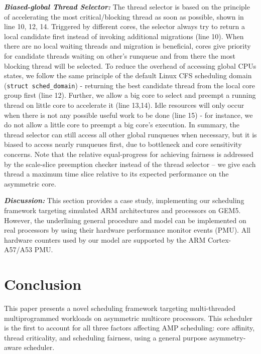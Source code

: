 \documentclass[10pt,conference]{IEEEtran}
\begin{document}
\textbf{\textit{Biased-global Thread Selector:}}
The thread selector is based on the principle of accelerating the most critical/blocking thread as soon as possible, shown in line 10, 12, 14. Triggered by different cores, the selector always try to return  a local candidate first instead of invoking additional migrations (line 10). When there are no local waiting threads and migration is beneficial, cores give priority for candidate threads waiting on other's runqueue and from there the most blocking thread will be selected.
To reduce the overhead of accessing global CPUs states, we follow the same principle of the default Linux CFS scheduling domain (\texttt{struct sched\_domain}) - returning the best candidate thread from the local core group first (line 12).
Further, we allow a big core to select and preempt a running thread on little core to accelerate it (line 13,14). Idle resources will only occur when there is not any possible useful work to be done (line 15) - for instance, we do not allow a little core to preempt a big core's execution. 
In summary, the thread selector can still access all other global runqueues when necessary, but it is biased to access nearly runqueues first, due to bottleneck and core sensitivity concerns. 
Note that the relative equal-progress for achieving fairness is addressed by the scale-slice preemption checker instead of the thread selector -- we give each thread a maximum time slice relative to its expected performance on the asymmetric core.

\textbf{\textit{Discussion:}}
This section provides a case study, implementing our scheduling framework targeting simulated ARM architectures and processors on GEM5.  However, the underlining general procedure and model can be implemented on real processors by using their hardware performance monitor events (PMU). All hardware counters used by our model are supported by the ARM Cortex-A57/A53 \cite{ARMA57} PMU.


\section{Conclusion}
This paper presents a novel scheduling framework targeting multi-threaded multiprogrammed workloads on asymmetric multicore processors. This scheduler is the first to account for all three factors affecting AMP scheduling: core affinity, thread criticality, and scheduling fairness, using a general purpose asymmetry-aware scheduler.
\end{document}
